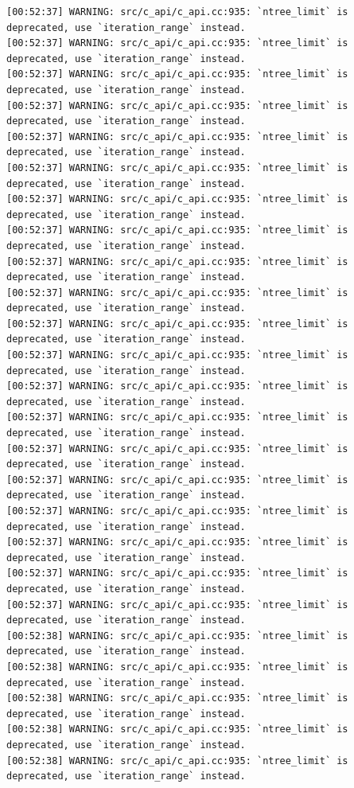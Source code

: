 \documentclass[
  letterpaper,
  DIV=11,
  numbers=noendperiod]{scrartcl}
\begin{document}
\begin{verbatim}
[00:52:37] WARNING: src/c_api/c_api.cc:935: `ntree_limit` is deprecated, use `iteration_range` instead.
[00:52:37] WARNING: src/c_api/c_api.cc:935: `ntree_limit` is deprecated, use `iteration_range` instead.
[00:52:37] WARNING: src/c_api/c_api.cc:935: `ntree_limit` is deprecated, use `iteration_range` instead.
[00:52:37] WARNING: src/c_api/c_api.cc:935: `ntree_limit` is deprecated, use `iteration_range` instead.
[00:52:37] WARNING: src/c_api/c_api.cc:935: `ntree_limit` is deprecated, use `iteration_range` instead.
[00:52:37] WARNING: src/c_api/c_api.cc:935: `ntree_limit` is deprecated, use `iteration_range` instead.
[00:52:37] WARNING: src/c_api/c_api.cc:935: `ntree_limit` is deprecated, use `iteration_range` instead.
[00:52:37] WARNING: src/c_api/c_api.cc:935: `ntree_limit` is deprecated, use `iteration_range` instead.
[00:52:37] WARNING: src/c_api/c_api.cc:935: `ntree_limit` is deprecated, use `iteration_range` instead.
[00:52:37] WARNING: src/c_api/c_api.cc:935: `ntree_limit` is deprecated, use `iteration_range` instead.
[00:52:37] WARNING: src/c_api/c_api.cc:935: `ntree_limit` is deprecated, use `iteration_range` instead.
[00:52:37] WARNING: src/c_api/c_api.cc:935: `ntree_limit` is deprecated, use `iteration_range` instead.
[00:52:37] WARNING: src/c_api/c_api.cc:935: `ntree_limit` is deprecated, use `iteration_range` instead.
[00:52:37] WARNING: src/c_api/c_api.cc:935: `ntree_limit` is deprecated, use `iteration_range` instead.
[00:52:37] WARNING: src/c_api/c_api.cc:935: `ntree_limit` is deprecated, use `iteration_range` instead.
[00:52:37] WARNING: src/c_api/c_api.cc:935: `ntree_limit` is deprecated, use `iteration_range` instead.
[00:52:37] WARNING: src/c_api/c_api.cc:935: `ntree_limit` is deprecated, use `iteration_range` instead.
[00:52:37] WARNING: src/c_api/c_api.cc:935: `ntree_limit` is deprecated, use `iteration_range` instead.
[00:52:37] WARNING: src/c_api/c_api.cc:935: `ntree_limit` is deprecated, use `iteration_range` instead.
[00:52:37] WARNING: src/c_api/c_api.cc:935: `ntree_limit` is deprecated, use `iteration_range` instead.
[00:52:38] WARNING: src/c_api/c_api.cc:935: `ntree_limit` is deprecated, use `iteration_range` instead.
[00:52:38] WARNING: src/c_api/c_api.cc:935: `ntree_limit` is deprecated, use `iteration_range` instead.
[00:52:38] WARNING: src/c_api/c_api.cc:935: `ntree_limit` is deprecated, use `iteration_range` instead.
[00:52:38] WARNING: src/c_api/c_api.cc:935: `ntree_limit` is deprecated, use `iteration_range` instead.
[00:52:38] WARNING: src/c_api/c_api.cc:935: `ntree_limit` is deprecated, use `iteration_range` instead.

\end{verbatim}
\end{document}
